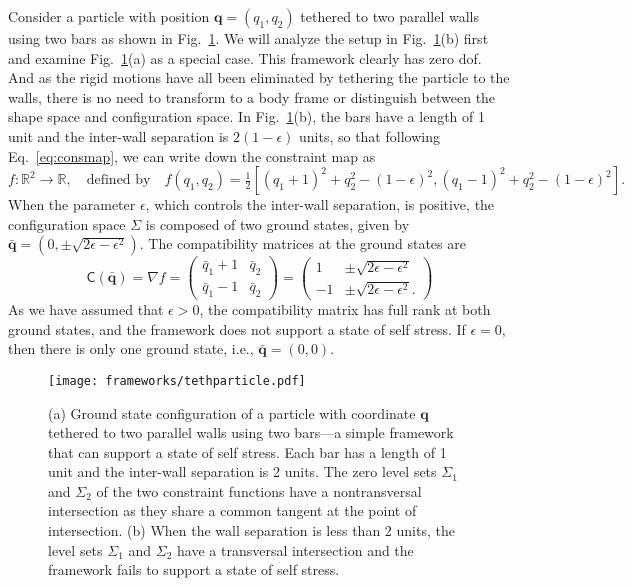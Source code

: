 \begin{example}
  Consider a particle with position $\bm{q} = (q_{1}, q_{2})$ tethered to two parallel walls using two bars as shown in Fig.~\ref{fig:tether}.
  We will analyze the setup in Fig.~\ref{fig:tether}(b) first and examine Fig.~\ref{fig:tether}(a)
  as a special case.
This framework clearly has zero \ac{dof}.
And as the rigid motions have all been eliminated by tethering the particle to the walls, there is no need to transform to a body frame or distinguish between the shape space and configuration space.
  In Fig.~\ref{fig:tether}(b), the bars have a length of 1 unit and the inter-wall separation is $2(1 - \epsilon)$ units, so that following Eq.~\eqref{eq:consmap}, we can write down the constraint map as
%
\begin{equation}
  f: \mathbb{R}^{2} \to \mathbb{R},
  \quad\text{defined by}\quad
  f(q_{1}, q_{2}) = \tfrac{1}{2}\left[(q_{1} + 1)^{2} + q_{2}^{2} - (1 - \epsilon)^{2}, (q_{1}-1)^{2} + q_{2}^{2} - (1 - \epsilon)^{2}\right].
\end{equation}
%
When the parameter $\epsilon$, which controls the inter-wall separation, is positive, the configuration space $\Sigma$ is composed of two ground states, given by $\bar{\bm{q}} = (0, \pm\sqrt{2\epsilon - \epsilon^{2}})$.
%
The compatibility matrices at the ground states are
%
\begin{equation}
  \mathsf{C}(\bar{\bm{q}}) = \nabla f = \begin{pmatrix}
    \bar{q}_{1} + 1 & \bar{q}_{2}\\
    \bar{q}_{1} - 1 & \bar{q}_{2}
  \end{pmatrix}
  =
  \begin{pmatrix}
    1 & \pm\sqrt{2\epsilon - \epsilon^{2}}\\
    -1 & \pm\sqrt{2\epsilon - \epsilon^{2}}.
  \end{pmatrix}
\end{equation}
%
As we have assumed that $\epsilon > 0$, the compatibility matrix has full rank at both ground states, and the framework does not support a state of self stress.
If $\epsilon = 0$, then there is only one ground state, i.e., $\bm{\bar{q}} = (0, 0)$.

\end{example}

\begin{figure}
  \begin{center}
    \texttt{[image: frameworks/tethparticle.pdf]}
  \end{center}
  \caption{(a) Ground state configuration of a particle with coordinate $\bm{q}$ tethered to two parallel walls using two bars---a simple framework that can support a state of self stress.
    Each bar has a length of 1 unit and the inter-wall separation is 2 units.
  The zero level sets $\Sigma_1$ and $\Sigma_2$ of the two constraint functions have a nontransversal intersection as they share a common tangent at the point of intersection.
  (b) When the wall separation is less than 2 units, the level sets $\Sigma_{1}$ and $\Sigma_{2}$ have a transversal intersection and the framework fails to support a state of self stress.
}
  \label{fig:tether}
\end{figure}

